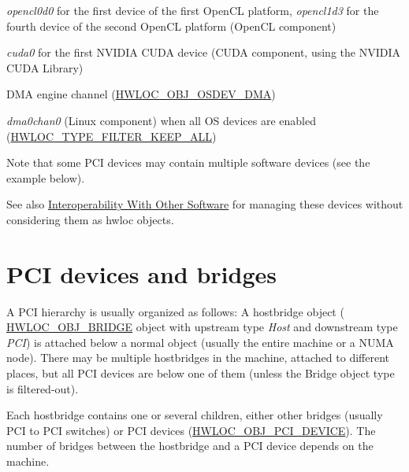 \begin{DoxyItemize}
\begin{DoxyItemize}
\item {\itshape opencl0d0} for the first device of the first Open\+CL platform, {\itshape opencl1d3} for the fourth device of the second Open\+CL platform (Open\+CL component) 
\item {\itshape cuda0} for the first N\+V\+I\+D\+IA C\+U\+DA device (C\+U\+DA component, using the N\+V\+I\+D\+IA C\+U\+DA Library)  
\item D\+MA engine channel (\hyperlink{a00184_gga64f5d539df299c97ae80ce53fc4b56c0a827ad1643360711a8b6c6af671366791}{H\+W\+L\+O\+C\+\_\+\+O\+B\+J\+\_\+\+O\+S\+D\+E\+V\+\_\+\+D\+MA}) 
\begin{DoxyItemize}
\item {\itshape dma0chan0} (Linux component) when all OS devices are enabled (\hyperlink{a00193_gga9a5a1f0140cd1952544477833733195bafda7b59e6810dfe778d8f9a4cc1e350e}{H\+W\+L\+O\+C\+\_\+\+T\+Y\+P\+E\+\_\+\+F\+I\+L\+T\+E\+R\+\_\+\+K\+E\+E\+P\+\_\+\+A\+LL}) 
\end{DoxyItemize}
\end{DoxyItemize}

Note that some P\+CI devices may contain multiple software devices (see the example below).

See also \hyperlink{a00390}{Interoperability With Other Software} for managing these devices without considering them as hwloc objects.

 
\end{DoxyItemize}\hypertarget{a00384_iodevices_pci}{}\section{P\+C\+I devices and bridges}\label{a00384_iodevices_pci}
A P\+CI hierarchy is usually organized as follows\+: A hostbridge object ( {\ttfamily \hyperlink{a00184_ggacd37bb612667dc437d66bfb175a8dc55a6825f10895fea60aca7a6ba9fe273db0}{H\+W\+L\+O\+C\+\_\+\+O\+B\+J\+\_\+\+B\+R\+I\+D\+GE}} object with upstream type {\itshape Host} and downstream type {\itshape P\+CI}) is attached below a normal object (usually the entire machine or a N\+U\+MA node). There may be multiple hostbridges in the machine, attached to different places, but all P\+CI devices are below one of them (unless the Bridge object type is filtered-\/out).

Each hostbridge contains one or several children, either other bridges (usually P\+CI to P\+CI switches) or P\+CI devices ({\ttfamily \hyperlink{a00184_ggacd37bb612667dc437d66bfb175a8dc55a5d8117a54df1fbd3606ab19e42cb0ea9}{H\+W\+L\+O\+C\+\_\+\+O\+B\+J\+\_\+\+P\+C\+I\+\_\+\+D\+E\+V\+I\+CE}}). The number of bridges between the hostbridge and a P\+CI device depends on the machine.

